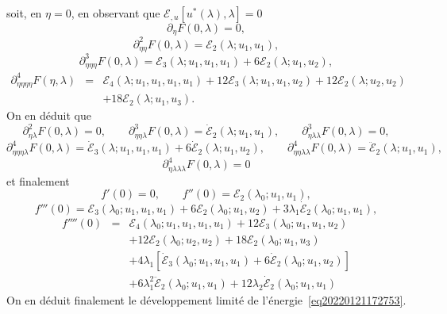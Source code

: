 \documentclass{article}
\begin{document}
soit, en $\eta = 0$, en observant que $\mathcal{E}_{, u} [u^{\ast} (\lambda),
\lambda] = 0$
\begin{equation}
  \partial_{\eta} F (0, \lambda) = 0,
\end{equation}
\begin{equation}
  \partial_{\eta  \eta}^2 F (0, \lambda) =\mathcal{E}_2 (\lambda ;
  u_1, u_1),
\end{equation}
\begin{equation}
  \partial_{\eta  \eta  \eta}^3 F (0, \lambda) =\mathcal{E}_3
  (\lambda ; u_1, u_1, u_1) + 6\mathcal{E}_2 (\lambda ; u_1, u_2),
\end{equation}
\begin{eqnarray}
  \partial_{\eta  \eta  \eta  \eta}^4 F (\eta,
  \lambda) & = & \mathcal{E}_4 (\lambda ; u_1, u_1, u_1, u_1) +
  12\mathcal{E}_3 (\lambda ; u_1, u_1, u_2) + 12\mathcal{E}_2 (\lambda ; u_2,
  u_2) \nonumber\\
  &  & + 18\mathcal{E}_2 (\lambda ; u_1, u_3) .
\end{eqnarray}
On en d{\'e}duit que
\begin{equation}
  \partial_{\eta  \lambda}^2 F (0, \lambda) = 0, \qquad \partial_{\eta
   \eta  \lambda}^3 F (0, \lambda) = \dot{\mathcal{E}}_2
  (\lambda ; u_1, u_1), \qquad \partial_{\eta  \lambda
  \lambda}^3 F (0, \lambda) = 0,
\end{equation}
\begin{equation}
  \partial_{\eta  \eta  \eta  \lambda}^4 F (0,
  \lambda) = \dot{\mathcal{E}}_3 (\lambda ; u_1, u_1, u_1) + 6
  \dot{\mathcal{E}}_2 (\lambda ; u_1, u_2), \qquad \partial_{\eta
  \eta  \lambda  \lambda}^4 F (0, \lambda) =
  \ddot{\mathcal{E}}_2 (\lambda ; u_1, u_1),
\end{equation}
\begin{equation}
  \partial_{\eta  \lambda  \lambda  \lambda}^4 F (0,
  \lambda) = 0
\end{equation}
et finalement
\begin{equation}
  f' (0) = 0, \qquad f'' (0) =\mathcal{E}_2 (\lambda_0 ; u_1, u_1),
\end{equation}
\begin{equation}
  f''' (0) =\mathcal{E}_3 (\lambda_0 ; u_1, u_1, u_1) + 6\mathcal{E}_2
  (\lambda_0 ; u_1, u_2) + 3 \lambda_1  \dot{\mathcal{E}}_2 (\lambda_0 ; u_1,
  u_1),
\end{equation}
\begin{eqnarray}
  f'''' (0) & = & \mathcal{E}_4 (\lambda_0 ; u_1, u_1, u_1, u_1) +
  12\mathcal{E}_3 (\lambda_0 ; u_1, u_1, u_2) \nonumber\\
  &  & + 12\mathcal{E}_2 (\lambda_0 ; u_2, u_2) + 18\mathcal{E}_2 (\lambda_0
  ; u_1, u_3) \nonumber\\
  &  & + 4 \lambda_1  [\dot{\mathcal{E}}_3 (\lambda_0 ; u_1, u_1, u_1) + 6
  \dot{\mathcal{E}}_2 (\lambda_0 ; u_1, u_2)] \nonumber\\
  &  & + 6 \lambda_1^2  \ddot{\mathcal{E}}_2 (\lambda_0 ; u_1, u_1) + 12
  \lambda_2  \dot{\mathcal{E}}_2 (\lambda_0 ; u_1, u_1)
\end{eqnarray}
On en d{\'e}duit finalement le d{\'e}veloppement limit{\'e} de
l'{\'e}nergie~\eqref{eq20220121172753}.
\end{document}
